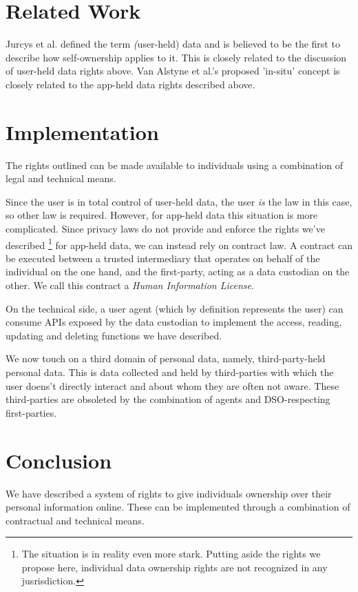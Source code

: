 \documentclass[11pt, oneside]{article}   	%
\begin{document}
\section{Related Work}

Jurcys et al.\cite{Jurcys2021} defined the term \emph(user-held) data and is believed to be the first to describe how self-ownership applies to it. This is closely related to the discussion of user-held data rights above. Van Alstyne et al.\cite{Alstyne2021}'s proposed 'in-situ' concept is closely related to the app-held data rights described above.

\section{Implementation}
The rights outlined can be made available to individuals using a combination of legal and technical means. 

Since the user is in total control of user-held data, the user \emph{is} the law in this case, so other law is required. However, for app-held data this situation is more complicated. Since privacy laws do not provide and enforce the rights we've described \footnote{The situation is in reality even more stark. Putting aside the rights we propose here, individual data ownership rights are not recognized in any jusrisdiction.} for app-held data, we can instead rely on contract law. A contract can be executed between a trusted intermediary that operates on behalf of the individual on the one hand, and the first-party, acting as a data custodian on the other. We call this contract a \emph{Human Information License}. 

On the technical side, a user agent (which by definition represents the user) can consume APIs exposed by the data custodian to implement the access, reading, updating and deleting functions we have described. 

We now touch on a third domain of personal data, namely, third-party-held personal data. This is data collected and held by third-parties with which the user doens't directly interact and about whom they are often not aware. These third-parties are obsoleted by the combination of agents and DSO-respecting first-parties.  

\section{Conclusion}
We have described a system of rights to give individuals ownership over their personal information online. These can be implemented through a combination of contractual and technical means.



\end{document}
